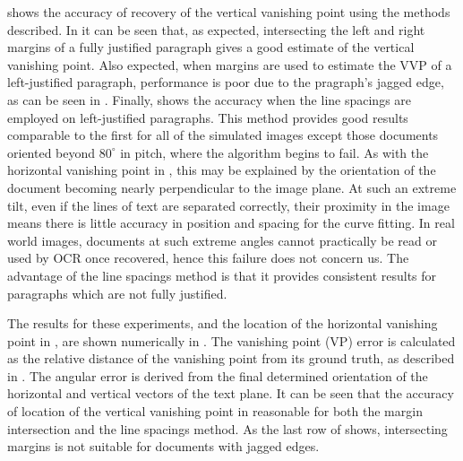 { shows the accuracy of recovery of the vertical vanishing point using the methods described.
In  it can be seen that,
as expected, intersecting the left and right margins of a fully justified paragraph gives a good estimate of the vertical vanishing point.
Also expected, when margins are used to estimate the VVP of a left-justified
paragraph, performance is poor due to the pragraph's jagged edge, as can be
seen in .
Finally,  shows the accuracy when the line spacings are employed on left-justified paragraphs.
This method provides good results comparable to the first for all of the simulated images except those documents oriented beyond $80^\circ$ in pitch, where the algorithm begins to fail.
As with the horizontal vanishing point in , this may be explained by the orientation of the document becoming nearly perpendicular to the image plane.
At such an extreme tilt, even if the lines of text are separated correctly, their proximity in the image means there is little accuracy in position and spacing for the curve fitting.
In real world images, documents at such extreme angles cannot practically be read or used by OCR once recovered, hence this failure does not concern us.
The advantage of the line spacings method is that it provides consistent results for paragraphs which are not fully justified.

The results for these experiments, and the location of the horizontal vanishing point in , are shown numerically in .
The vanishing point (VP) error is calculated as the relative distance of the vanishing point from its ground truth, as described in .
The angular error is derived from the final determined orientation of the horizontal and vertical vectors of the text plane.
It can be seen that the accuracy of location of the vertical vanishing point in reasonable for both the margin intersection and the line spacings method.
As the last row of  shows, intersecting margins is not suitable for documents with jagged edges.

}


